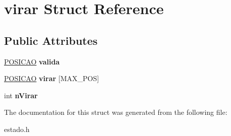 \hypertarget{structvirar}{}\section{virar Struct Reference}
\label{structvirar}
\subsection*{Public Attributes}
\begin{DoxyCompactItemize}
\item 
\mbox{\label{structvirar_a947d73d24cb14c386b5914370bdc719c}} 
\mbox{\hyperlink{structposicao}{P\+O\+S\+I\+C\+AO}} {\bfseries valida}
\item 
\mbox{\label{structvirar_a088b1c1174fba271650acd418163bfd5}} 
\mbox{\hyperlink{structposicao}{P\+O\+S\+I\+C\+AO}} {\bfseries virar} \mbox{[}M\+A\+X\+\_\+\+P\+OS\mbox{]}
\item 
\mbox{\label{structvirar_a07f8bf5f182527b93cb769f7ffcc9047}} 
int {\bfseries n\+Virar}
\end{DoxyCompactItemize}


The documentation for this struct was generated from the following file\+:\begin{DoxyCompactItemize}
\item 
estado.\+h\end{DoxyCompactItemize}
